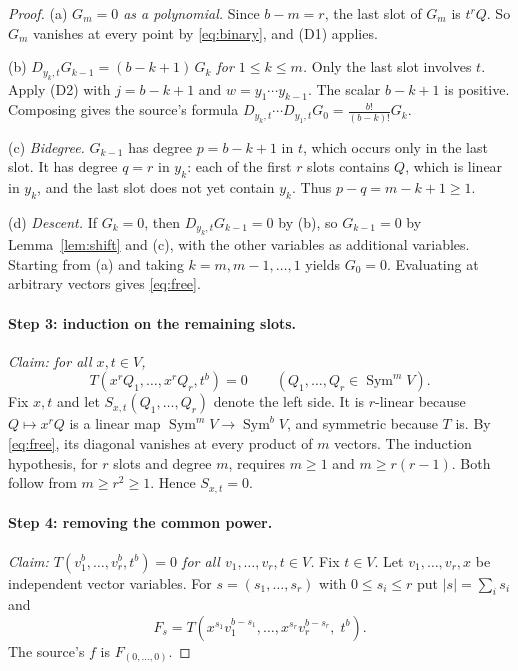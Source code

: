 \documentclass[11pt]{article}
\theoremstyle{remark}
\DeclareMathOperator{\Sym}{Sym}
\newcommand{\D}[2]{D_{#1,#2}}
\begin{document}
\begin{proof}
(a) \emph{$G_m=0$ as a polynomial.} Since $b-m=r$, the last slot of $G_m$
is $t^rQ$. So $G_m$ vanishes at every point by \eqref{eq:binary}, and (D1)
applies.

(b) \emph{$\D{y_k}{t}G_{k-1}=(b-k+1)\,G_k$ for $1\le k\le m$.} Only the
last slot involves $t$. Apply (D2) with $j=b-k+1$ and
$w=y_1\cdots y_{k-1}$. The scalar $b-k+1$ is positive. Composing gives the
source's formula
$\D{y_k}{t}\cdots\D{y_1}{t}G_0=\frac{b!}{(b-k)!}G_k$.

(c) \emph{Bidegree.} $G_{k-1}$ has degree $p=b-k+1$ in $t$, which occurs
only in the last slot. It has degree $q=r$ in $y_k$: each of the first $r$
slots contains $Q$, which is linear in $y_k$, and the last slot does not
yet contain $y_k$. Thus $p-q=m-k+1\ge1$.

(d) \emph{Descent.} If $G_k=0$, then $\D{y_k}{t}G_{k-1}=0$ by (b), so
$G_{k-1}=0$ by Lemma~\ref{lem:shift} and (c), with the other variables as
additional variables. Starting from (a) and taking $k=m,m-1,\ldots,1$
yields $G_0=0$. Evaluating at arbitrary vectors gives \eqref{eq:free}.

\paragraph{Step 3: induction on the remaining slots.}
\emph{Claim: for all $x,t\in V$,}
\begin{equation}\label{eq:inductive-vanishing}
 T(x^rQ_1,\ldots,x^rQ_r,t^b)=0
 \qquad(Q_1,\ldots,Q_r\in\Sym^m V).
\end{equation}
Fix $x,t$ and let $S_{x,t}(Q_1,\ldots,Q_r)$ denote the left side. It is
$r$-linear because $Q\mapsto x^rQ$ is a linear map $\Sym^mV\to\Sym^bV$, and
symmetric because $T$ is. By \eqref{eq:free}, its diagonal vanishes at
every product of $m$ vectors. The induction hypothesis, for $r$ slots and degree
$m$, requires $m\ge1$ and $m\ge r(r-1)$. Both follow from $m\ge r^2\ge1$.
Hence $S_{x,t}=0$.

\paragraph{Step 4: removing the common power.}
\emph{Claim: $T(v_1^b,\ldots,v_r^b,t^b)=0$ for all
$v_1,\ldots,v_r,t\in V$.}
Fix $t\in V$. Let $v_1,\ldots,v_r,x$ be independent vector variables. For
$s=(s_1,\ldots,s_r)$ with $0\le s_i\le r$ put $|s|=\sum_is_i$ and
\[
 F_s=T(x^{s_1}v_1^{b-s_1},\ldots,x^{s_r}v_r^{b-s_r},\;t^b).
\]
The source's $f$ is $F_{(0,\ldots,0)}$.


\end{proof}
\end{document}
